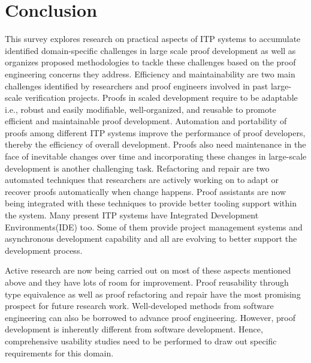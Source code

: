 \section{Conclusion}
\label{sec:conclusion}

This survey explores research on practical aspects of ITP systems to accumulate identified domain-specific challenges in large scale proof development as well as organizes proposed methodologies to tackle these challenges based on the proof engineering concerns they address. Efficiency and maintainability are two main challenges identified by researchers and proof engineers involved in past large-scale verification projects. Proofs in scaled development require to be adaptable i.e., robust and easily modifiable, well-organized, and reusable to promote efficient and maintainable proof development. Automation and portability of proofs among different ITP systems improve the performance of proof developers, thereby the efficiency of overall development. Proofs also need maintenance in the face of inevitable changes over time and incorporating these changes in large-scale development is another challenging task. Refactoring and repair are two automated techniques that researchers are actively working on to adapt or recover proofs automatically when change happens. Proof assistants are now being integrated with these techniques to provide better tooling support within the system. Many present ITP systems have Integrated Development Environments(IDE) too. Some of them provide project management systems and asynchronous development capability and all are evolving to better support the development process. 

Active research are now being carried out on most of these aspects mentioned above and they have lots of room for improvement. Proof reusability through type equivalence as well as proof refactoring and repair have the most promising prospect for future research work. Well-developed methods from software engineering can also be borrowed to advance proof engineering. However, proof development is inherently different from software development. Hence, comprehensive usability studies need to be performed to draw out specific requirements for this domain.





